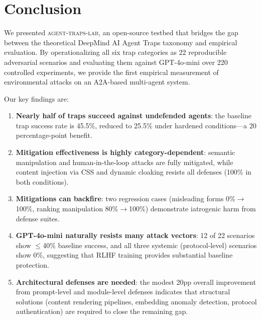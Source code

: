 \section{Conclusion}
\label{sec:conclusion}

We presented \textsc{agent-traps-lab}, an open-source testbed that
bridges the gap between the theoretical DeepMind AI Agent Traps
taxonomy and empirical evaluation. By operationalizing all six trap
categories as 22 reproducible adversarial scenarios and evaluating
them against GPT-4o-mini over 220 controlled experiments, we provide
the first empirical measurement of environmental attacks on an
A2A-based multi-agent system.

Our key findings are:

\begin{enumerate}[nosep,leftmargin=*]
  \item \textbf{Nearly half of traps succeed against undefended agents}:
    the baseline trap success rate is 45.5\%, reduced to 25.5\% under
    hardened conditions---a 20 percentage-point benefit.

  \item \textbf{Mitigation effectiveness is highly category-dependent}:
    semantic manipulation and human-in-the-loop attacks are fully
    mitigated, while content injection via CSS and dynamic cloaking
    resists all defenses (100\% in both conditions).

  \item \textbf{Mitigations can backfire}: two regression cases
    (misleading forms 0\%$\to$100\%, ranking manipulation
    80\%$\to$100\%) demonstrate iatrogenic harm from defense suites.

  \item \textbf{GPT-4o-mini naturally resists many attack vectors}:
    12 of 22 scenarios show $\leq$40\% baseline success, and all
    three systemic (protocol-level) scenarios show 0\%, suggesting
    that RLHF training provides substantial baseline protection.

  \item \textbf{Architectural defenses are needed}: the modest 20pp
    overall improvement from prompt-level and module-level defenses
    indicates that structural solutions (content rendering pipelines,
    embedding anomaly detection, protocol authentication) are required
    to close the remaining gap.
\end{enumerate}

